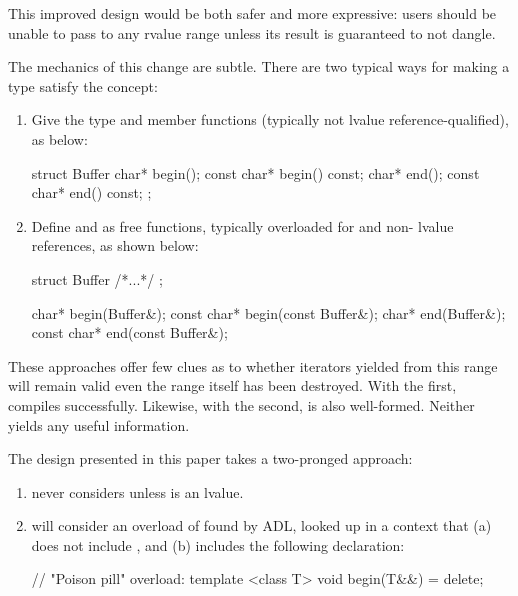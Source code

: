 \pnum
This improved design would be both safer and more expressive: users should be
unable to pass to  any rvalue range unless its result is
guaranteed to not dangle.

\pnum
The mechanics of this change are subtle. There are two typical ways for making
a type satisfy the  concept:

\begin{enumerate}
\item Give the type  and  member functions
(typically not lvalue reference-qualified), as below:
\begin{codeblock}
struct Buffer {
  char* begin();
  const char* begin() const;
  char* end();
  const char* end() const;
};
\end{codeblock}
\item Define  and  as free functions, typically
overloaded for  and non- lvalue references, as shown
below:
\begin{codeblock}
struct Buffer { /*...*/ };

char* begin(Buffer&);
const char* begin(const Buffer&);
char* end(Buffer&);
const char* end(const Buffer&);
\end{codeblock}
\end{enumerate}

\pnum
These approaches offer few clues as to whether iterators yielded from this range
will remain valid even the range itself has been destroyed. With the first,
 compiles successfully. Likewise, with the second,
 is also well-formed. Neither yields any useful
information.

\pnum
The design presented in this paper takes a two-pronged approach:

\begin{enumerate}
\item {} never considers  unless 
is an lvalue.
\item {} will consider an overload of 
found by ADL, looked up in a context that (a) does not include
, and (b) includes the following declaration:
\begin{codeblock}
// "Poison pill" overload:
template <class T>
void begin(T&&) = delete;
\end{codeblock}
\end{enumerate}

